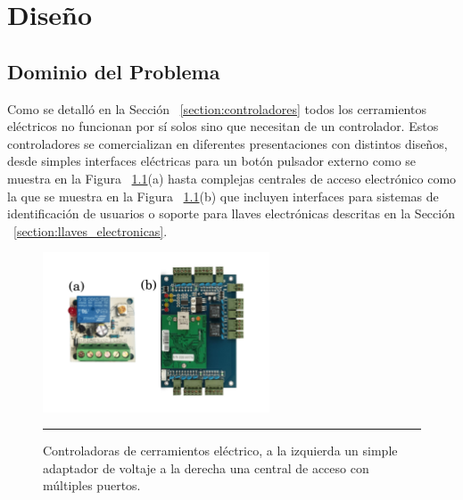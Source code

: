 
\chapter{Diseño} %

\label{Chapter4} %


\section{Dominio del Problema}
Como se detalló en la Sección ~\ref{section:controladores} todos los cerramientos eléctricos no funcionan por sí solos sino que necesitan de un controlador. Estos controladores se comercializan en diferentes presentaciones con distintos diseños, desde simples interfaces eléctricas para un botón pulsador externo como se muestra en la Figura ~\ref{fig:controladoras_simple_compleja}(a) hasta complejas centrales de acceso electrónico como la que se muestra en la Figura ~\ref{fig:controladoras_simple_compleja}(b) que incluyen interfaces para sistemas de identificación de usuarios o soporte para llaves electrónicas descritas en la Sección ~\ref{section:llaves_electronicas}.
\begin{figure}[htbp]
	\centering
	\includegraphics[width=0.6\textwidth]{Pictures/controladoras_simple_compleja.png}
	\rule{35em}{1pt}
	\caption[Controladoras Comparativa]{Controladoras de cerramientos eléctrico, a la izquierda un simple adaptador de voltaje a la derecha una central de acceso con múltiples puertos. }
	\label{fig:controladoras_simple_compleja}
\end{figure}

